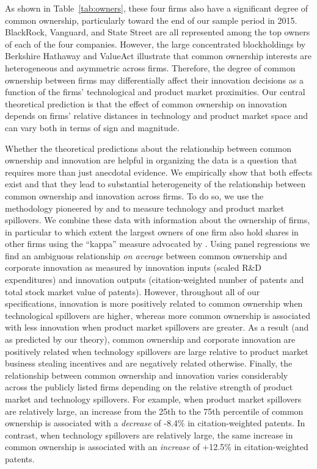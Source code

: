 \documentclass[12pt]{article}
\begin{document}
As shown in Table~\ref{tab:owners}, these four firms also have a significant degree of common ownership, particularly toward the end of our sample period in 2015. BlackRock, Vanguard, and State Street are all represented among the top owners of each of the four companies. However, the large concentrated blockholdings by Berkshire Hathaway and ValueAct illustrate that common ownership interests are heterogeneous and asymmetric across firms. Therefore, the degree of common ownership between firms may differentially affect their innovation decisions as a function of the firms' technological and product market proximities. Our central theoretical prediction is that the effect of common ownership on innovation depends on firms' relative distances in technology and product market space and can vary both in terms of sign and magnitude.

Whether the theoretical predictions about the relationship between common ownership and innovation are helpful in organizing the data is a question that requires more than just anecdotal evidence. We empirically show that both effects exist and that they lead to substantial heterogeneity of the relationship between common ownership and innovation across firms. To do so, we use the methodology pioneered by \citet{bloom2013} and \citet{lucking2018spillovers} to measure technology and product market spillovers.
We combine these data with information about the ownership of firms, in particular to which extent the largest owners of one firm also hold shares in other firms using the ``kappa'' measure advocated by \cite{backus2021common}. Using panel regressions we find an ambiguous relationship \emph{on average} between common ownership and corporate innovation as measured by innovation inputs (scaled R\&D expenditures) and innovation outputs (citation-weighted number of patents and total stock market value of patents). However, throughout all of our specifications, innovation is more positively related to common ownership when technological spillovers are higher, whereas more common ownership is associated with less innovation when product market spillovers are greater. As a result (and as predicted by our theory), common ownership and corporate innovation are positively related when technology spillovers are large relative to product market business stealing incentives and are negatively related otherwise. Finally, the relationship between common ownership and innovation varies considerably across the publicly listed firms depending on the relative strength of product market and technology spillovers. For example, when product market spillovers are relatively large, an increase from the 25th to the 75th percentile of common ownership is associated with a \emph{decrease} of -8.4\% in citation-weighted patents. In contrast, when technology spillovers are relatively large, the same increase in common ownership is associated with an \emph{increase} of +12.5\% in citation-weighted patents.
\end{document}
